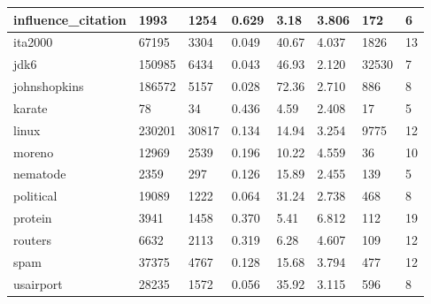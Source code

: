 \begin{longtable}[c]{|l|l|l|l|l|l|l|l|}
			influence\_citation & 1993           & 1254           & 0.629          & 3.18              & 3.806        & 172                & 6                 \\ \hline
			ita2000             & 67195          & 3304           & 0.049          & 40.67             & 4.037        & 1826               & 13                \\ \hline
			jdk6                & 150985         & 6434           & 0.043          & 46.93             & 2.120        & 32530              & 7                 \\ \hline
			johnshopkins        & 186572         & 5157           & 0.028          & 72.36             & 2.710        & 886                & 8                 \\ \hline
			karate              & 78             & 34             & 0.436          & 4.59              & 2.408        & 17                 & 5                 \\ \hline
			linux               & 230201         & 30817          & 0.134          & 14.94             & 3.254        & 9775               & 12                \\ \hline
			moreno              & 12969          & 2539           & 0.196          & 10.22             & 4.559        & 36                 & 10                \\ \hline
			nematode            & 2359           & 297            & 0.126          & 15.89             & 2.455        & 139                & 5                 \\ \hline
			political           & 19089          & 1222           & 0.064          & 31.24             & 2.738        & 468                & 8                 \\ \hline
			protein             & 3941           & 1458           & 0.370          & 5.41              & 6.812        & 112                & 19                \\ \hline
			routers             & 6632           & 2113           & 0.319          & 6.28              & 4.607        & 109                & 12                \\ \hline
			spam                & 37375          & 4767           & 0.128          & 15.68             & 3.794        & 477                & 12                \\ \hline
			usairport           & 28235          & 1572           & 0.056          & 35.92             & 3.115        & 596                & 8                 \\ \hline

\end{longtable}
